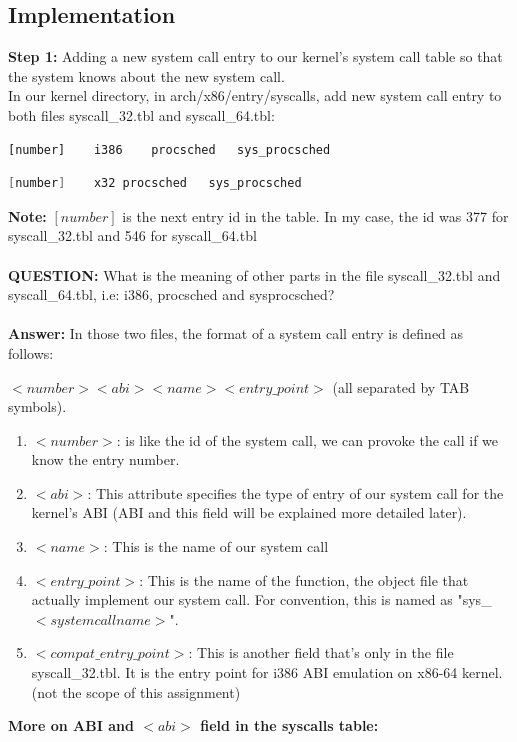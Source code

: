 \documentclass[a4paper]{article}
\begin{document}
\subsection{Implementation}
\textbf{Step 1:} Adding a new system call entry to our kernel's system call table so that the system knows about the new system call.\\
In our kernel directory, in arch/x86/entry/syscalls, add new system call entry to both files syscall\_32.tbl and syscall\_64.tbl:
\begin{lstlisting}[title=syscall\_32.tbl]
[number]	i386	procsched	sys_procsched
\end{lstlisting}
\begin{lstlisting}[language=c,title=syscall\_64.tbl]
[number]	x32	procsched	sys_procsched
\end{lstlisting}
\textbf{Note:} $[number]$ is the next entry id in the table. In my case, the id was 377 for syscall\_32.tbl and 546 for syscall\_64.tbl\\\\
\textbf{QUESTION:} What is the meaning of other parts in the file 
syscall\_32.tbl and syscall\_64.tbl, i.e: i386, procsched and sysprocsched?\\\\
\textbf{Answer:} In those two files, the format of a system call entry is defined as follows:
\begin{center}
$<number> <abi> <name> <entry\_point>$ (all separated by TAB symbols).
\end{center}
\begin{enumerate}
\item $<number>$: is like the id of the system call, we can provoke the call if we know the entry number.
\item $<abi>$: This attribute specifies the type of entry of our system call for the kernel's ABI (ABI and this field will be explained more detailed later).
\item $<name>$: This is the name of our system call
\item $<entry\_point>$: This is the name of the function, the object file that actually implement our system call. For convention, this is named as "sys\_$<system call name>$".
\item $<compat\_entry\_point>$: This is another field that's only in the file syscall\_32.tbl. It is the entry point for i386 ABI emulation on x86-64 kernel. (not the scope of this assignment)
\end{enumerate}
\textbf{More on ABI and $<abi>$ field in the syscalls table:}\\
\end{document}
